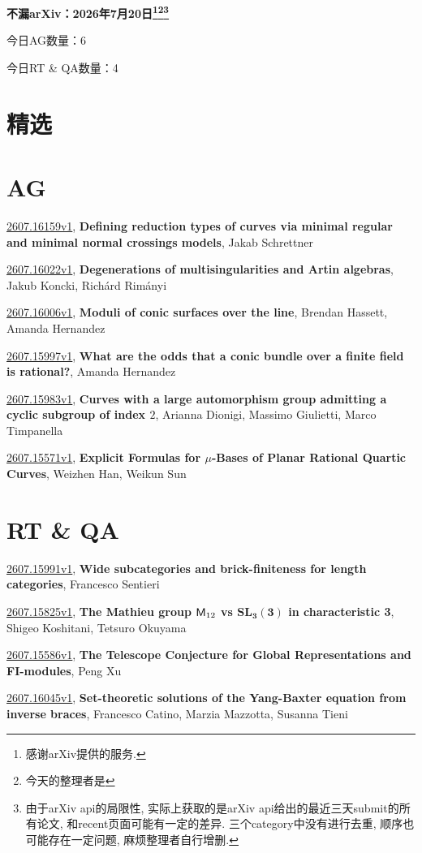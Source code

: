 \documentclass[9pt, a4paper]{article}
\theoremstyle{plain}
\theoremstyle{definition}
\theoremstyle{remark}
\newcommand{\arxiv}[3]{\href{https://arxiv.org/abs/#1}{#1}, \textbf{\textcolor{arxivblue}{#2}}, #3}
\newcommand{\AGnumber}{6}
\newcommand{\RTQAnumber}{4}
\newcommand{\NewestDate}{2026年7月20日}
\newcommand{\todayarXiver}{} %
\begin{document}
\begin{center}
    \Huge\textbf{不漏arXiv：\NewestDate\footnote{感谢arXiv提供的服务.}\footnote{今天的整理者是\todayarXiver}\footnote{由于arXiv api的局限性, 实际上获取的是arXiv api给出的最近三天submit的所有论文, 和recent页面可能有一定的差异. 三个category中没有进行去重, 顺序也可能存在一定问题, 麻烦整理者自行增删.}} \\
\end{center}

\setcounter{section}{-1}

\begin{center}
    今日AG数量：\AGnumber
    
    今日RT \& QA数量：\RTQAnumber
    
\end{center}


\section{精选}


\section{AG}
\arxiv{2607.16159v1}{Defining reduction types of curves via minimal regular and minimal normal crossings models}{Jakab Schrettner}

\arxiv{2607.16022v1}{Degenerations of multisingularities and Artin algebras}{Jakub Koncki, Richárd Rimányi}

\arxiv{2607.16006v1}{Moduli of conic surfaces over the line}{Brendan Hassett, Amanda Hernandez}

\arxiv{2607.15997v1}{What are the odds that a conic bundle over a finite field is rational?}{Amanda Hernandez}

\arxiv{2607.15983v1}{Curves with a large automorphism group admitting a cyclic subgroup of index $2$}{Arianna Dionigi, Massimo Giulietti, Marco Timpanella}

\arxiv{2607.15571v1}{Explicit Formulas for $μ$-Bases of Planar Rational Quartic Curves}{Weizhen Han, Weikun Sun}


\section{RT \& QA}
\arxiv{2607.15991v1}{Wide subcategories and brick-finiteness for length categories}{Francesco Sentieri}

\arxiv{2607.15825v1}{The Mathieu group ${\sf M}_{12}$ vs ${\mathbf{SL_3(3)}}$ in characteristic 3}{Shigeo Koshitani, Tetsuro Okuyama}

\arxiv{2607.15586v1}{The Telescope Conjecture for Global Representations and FI-modules}{Peng Xu}

\arxiv{2607.16045v1}{Set-theoretic solutions of the Yang-Baxter equation from inverse braces}{Francesco Catino, Marzia Mazzotta, Susanna Tieni}

\end{document}
